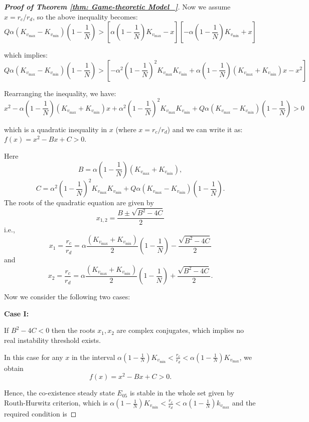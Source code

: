 \documentclass{article}
\theoremstyle{remark}
\theoremstyle{custom} %
\begin{document}
\begin{proof}[\textbf{Proof of Theorem \ref{thm: Game-theoretic Model_}}]
Now we assume \(x = r_c / r_d\), so the above inequality becomes:
\[
Q \alpha \left(K_{v_{\max}} - K_{v_{\min}}\right) \left(1 - \frac{1}{N}\right) > \left[\alpha \left(1 - \frac{1}{N}\right) K_{v_{\max}} - x\right] \left[-\alpha \left(1 - \frac{1}{N}\right) K_{v_{\min}} + x\right]
\]

which implies:
\[
Q \alpha \left(K_{v_{\max}} - K_{v_{\min}}\right) \left(1 - \frac{1}{N}\right) > \left[-\alpha^2 \left(1 - \frac{1}{N}\right)^2 K_{v_{\max}} K_{v_{\min}} + \alpha \left(1 - \frac{1}{N}\right) (K_{v_{\max}} + K_{v_{\min}}) x - x^2 \right]
\]


Rearranging the inequality, we have:
\[
x^2 - \alpha \left(1 - \frac{1}{N}\right) (K_{v_{\max}} + K_{v_{\min}}) x + \alpha^2 \left(1 - \frac{1}{N}\right)^2 K_{v_{\max}} K_{v_{\min}} + Q \alpha \left(K_{v_{\max}} - K_{v_{\min}}\right) \left(1 - \frac{1}{N}\right) > 0
\]

which is a quadratic inequality in \(x\) (where \(x = r_c / r_d\)) and we can write it as: $f(x)=
x^2 - B x + C > 0.$


Here
\[
B = \alpha \left(1 - \frac{1}{N}\right) (K_{v_{\max}} + K_{v_{\min}}),
\]
\[
C = \alpha^2 \left(1 - \frac{1}{N}\right)^2 K_{v_{\max}} K_{v_{\min}} + Q \alpha \left(K_{v_{\max}} - K_{v_{\min}}\right) \left(1 - \frac{1}{N}\right).
\]
The roots of the quadratic equation are given by
\[
x_{1,2} = \frac{B \pm \sqrt{B^2 - 4C}}{2}
\]
i.e.,
$$
x_1=\frac{r_c}{r_d}=\alpha \frac{\left(K_{v_{\max }}+K_{v_{\min }}\right)}{2} \left(1-\frac{1}{N}\right)-\frac{\sqrt{B^2-4 C}}{2}
$$
and
$$
x_2=\frac{r_c}{r_d}=\alpha \frac{\left(K_{v_{\max }}+K_{v_{\min }}\right)}{2} \left(1-\frac{1}{N}\right)+\frac{\sqrt{B^2-4 C}}{2}.
$$

Now we consider the following two cases:

\textbf{Case I:}


If $B^2-4 C<0$ then the roots $x_1, x_2$ are complex conjugates, which implies no real instability threshold exists.

In this case for any $x$ in the interval $\alpha\left(1-\frac{1}{N}\right) K_{v_{\min }}<\frac{r_c}{r_d}<\alpha\left(1-\frac{1}{N}\right) K_{v_{\max }}$, we obtain \[
f(x)=x^2 - B x + C > 0.
\]

Hence, the co-existence steady state $E_{05}$  is stable in the whole set given by Routh-Hurwitz criterion, which is $\alpha\left(1-\frac{1}{N}\right) K_{v_{\min }}<\frac{r_c}{r_d}<\alpha\left(1-\frac{1}{N}\right) k_{v_{\max }}$ and the required condition is


\end{proof}
\end{document}
